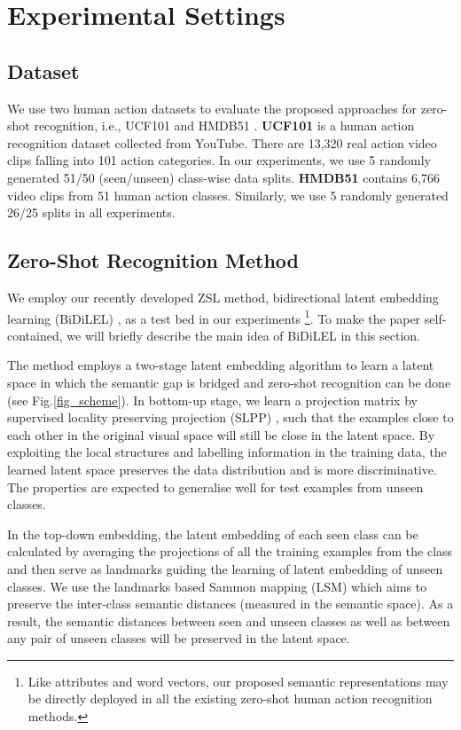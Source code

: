 \documentclass[runningheads,a4paper] {llncs}
\begin{document}
\section{Experimental Settings}
\subsection{Dataset}
We use two human action datasets to evaluate the proposed approaches for zero-shot recognition, i.e., UCF101 \cite{soomro2012ucf101} and HMDB51 \cite{kuehne2011hmdb}. \textbf{UCF101} is a human action recognition dataset collected from YouTube. There are 13,320 real action video clips falling into 101 action categories. In our experiments, we use 5 randomly generated 51/50 (seen/unseen) class-wise data splits. \textbf{HMDB51} contains 6,766 video clips from 51 human action classes. Similarly, we use 5 randomly generated 26/25 splits in all experiments.
\subsection{Zero-Shot Recognition Method}
\label{sect_bidilel}
We employ our recently developed ZSL method, bidirectional latent embedding learning (BiDiLEL) \cite{wang2016zero}, as a test bed in our experiments \footnote{Like attributes and word vectors, our proposed semantic representations may be directly deployed in all the existing zero-shot human action recognition methods.}. To make the paper self-contained, we will briefly describe the main idea of BiDiLEL in this section.

The method employs a two-stage latent embedding algorithm to learn a latent space in which the semantic gap is bridged and zero-shot recognition can be done (see Fig.\ref{fig_scheme}). In bottom-up stage, we learn a projection matrix  by supervised locality preserving projection (SLPP) \cite{cheng2005supervised}, such that the examples close to each other in the original visual space will still be close in the latent space. By exploiting the local structures and labelling information in the training data, the learned latent space preserves the data distribution and is more discriminative. The properties are expected to generalise well for test examples from unseen classes.

In the top-down embedding, the latent embedding of each seen class can be calculated by averaging the projections of all the training examples from the class and then serve as landmarks guiding the learning of latent embedding of unseen classes. We use the landmarks based Sammon mapping (LSM) \cite{wang2016zero} which aims to preserve the inter-class semantic distances (measured in the semantic space). As a result, the semantic distances between seen and unseen classes as well as between any pair of unseen classes will be preserved in the latent space.
\end{document}

